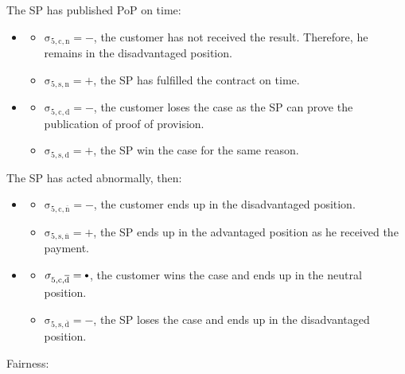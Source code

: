 \documentclass{ieeeaccess}
\newcommand\neutral[1][.75]{\mathbin{\ThisStyle{\vcenter{\hbox{%
  \scalebox{#1}{$\SavedStyle\bullet$}}}}}%
}
\begin{document}
The SP has published PoP on time:

\begin{itemize}
  \item \AgreeablePath
    \begin{itemize}
      \item \(\operatorname{\sigma_{5, c, n} = -}\), the customer has not received the result. Therefore, he remains in the disadvantaged position. 
      \item \(\operatorname{\sigma_{5, s, n} = +}\), the SP has fulfilled the contract on time.
    \end{itemize}
  \item \DisputePath
    \begin{itemize}
      \item \(\operatorname{\sigma_{5, c, d} = -}\), the customer loses the case as the SP can prove the publication of proof of provision. 
      \item \(\operatorname{\sigma_{5, s, d} = +}\), the SP win the case for the same reason.
    \end{itemize}
\end{itemize}

The SP has acted abnormally, then:

\begin{itemize}
\item \AgreeablePath
  \begin{itemize}
    \item \(\operatorname{\sigma_{5, c, \overline{n}} = -}\), the customer ends up in the disadvantaged position.
    \item \(\operatorname{\sigma_{5, s, \overline{n}} = +}\), the SP ends up in the advantaged position as he received the payment.
  \end{itemize}
\item \DisputePath
  \begin{itemize}
    \item \(\operatorname{\sigma_{5, c, \overline{d}} = \neutral}\), the customer wins the case and ends up in the neutral position. 
    \item \(\operatorname{\sigma_{5, s, \overline{d}} = -}\), the SP loses the case and ends up in the disadvantaged position. 
  \end{itemize}
\end{itemize}

Fairness:
\end{document}
